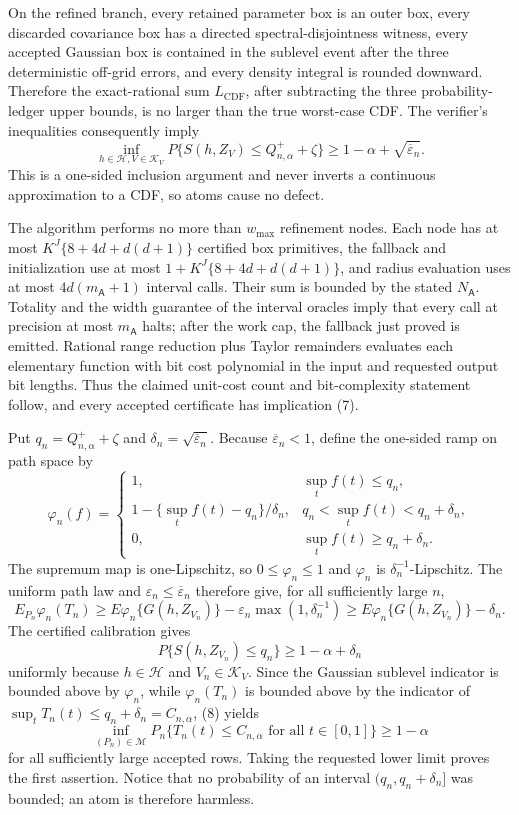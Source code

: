 On the refined branch, every retained parameter box is an outer box, every discarded covariance box has a directed spectral-disjointness witness, every accepted Gaussian box is contained in the sublevel event after the three deterministic off-grid errors, and every density integral is rounded downward.  Therefore the exact-rational sum \(L_{\mathrm{CDF}}\), after subtracting the three probability-ledger upper bounds, is no larger than the true worst-case CDF.  The verifier's inequalities consequently imply
\[
 \inf_{h\in\mathcal H,V\in\mathcal K_V}
 P\{S(h,Z_V)\le Q^+_{n,\alpha}+\zeta\}
 \ge1-\alpha+\sqrt{\overline\varepsilon_n}.            \tag{7}
\]
This is a one-sided inclusion argument and never inverts a continuous approximation to a CDF, so atoms cause no defect.

The algorithm performs no more than \(w_{\max}\) refinement nodes.  Each node has at most \(K^J\{8+4d+d(d+1)\}\) certified box primitives, the fallback and initialization use at most \(1+K^J\{8+4d+d(d+1)\}\), and radius evaluation uses at most \(4d(m_{\mathsf A}+1)\) interval calls.  Their sum is bounded by the stated \(N_{\mathsf A}\).  Totality and the width guarantee of the interval oracles imply that every call at precision at most \(m_{\mathsf A}\) halts; after the work cap, the fallback just proved is emitted.  Rational range reduction plus Taylor remainders evaluates each elementary function with bit cost polynomial in the input and requested output bit lengths.  Thus the claimed unit-cost count and bit-complexity statement follow, and every accepted certificate has implication (7).

Put \(q_n=Q^+_{n,\alpha}+\zeta\) and \(\delta_n=\sqrt{\overline\varepsilon_n}\).  Because \(\overline\varepsilon_n<1\), define the one-sided ramp on path space by
\[
 \varphi_n(f)=
 \begin{cases}
 1,&\sup_tf(t)\le q_n,\\
 1-\{\sup_tf(t)-q_n\}/\delta_n,&q_n<\sup_tf(t)<q_n+\delta_n,\\
 0,&\sup_tf(t)\ge q_n+\delta_n.
 \end{cases}
\]
The supremum map is one-Lipschitz, so \(0\le\varphi_n\le1\) and \(\varphi_n\) is \(\delta_n^{-1}\)-Lipschitz.  The uniform path law and \(\varepsilon_n\le\overline\varepsilon_n\) therefore give, for all sufficiently large \(n\),
\[
 E_{P_n}\varphi_n(T_n)
 \ge E\varphi_n\{G(h,Z_{V_n})\}
      -\varepsilon_n\max(1,\delta_n^{-1})
 \ge E\varphi_n\{G(h,Z_{V_n})\}-\delta_n.             \tag{8}
\]
The certified calibration gives
\[
 P\{S(h,Z_{V_n})\le q_n\}\ge1-\alpha+\delta_n
\]
uniformly because \(h\in\mathcal H\) and \(V_n\in\mathcal K_V\).  Since the Gaussian sublevel indicator is bounded above by \(\varphi_n\), while \(\varphi_n(T_n)\) is bounded above by the indicator of \(\sup_tT_n(t)\le q_n+\delta_n=C_{n,\alpha}\), (8) yields
\[
 \inf_{(P_n)\in\mathcal M}P_n\{T_n(t)\le C_{n,\alpha}
       \text{ for all }t\in[0,1]\}\ge1-\alpha
\]
for all sufficiently large accepted rows.  Taking the requested lower limit proves the first assertion.  Notice that no probability of an interval \((q_n,q_n+\delta_n]\) was bounded; an atom is therefore harmless.

